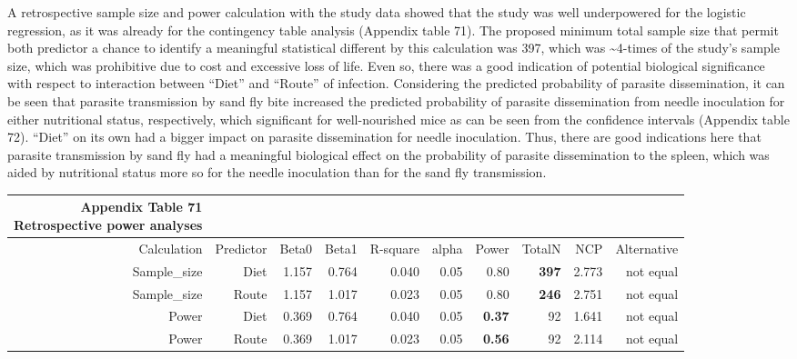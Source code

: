 \documentclass[
  12pt,
  letterpaper,
]{article}
\begin{document}
A retrospective sample size and power calculation with the study data showed that the study was well underpowered for the logistic regression, as it was already for the contingency table analysis (Appendix table 71). The proposed minimum total sample size that permit both predictor a chance to identify a meaningful statistical different by this calculation was 397, which was \textasciitilde4-times of the study's sample size, which was prohibitive due to cost and excessive loss of life. Even so, there was a good indication of potential biological significance with respect to interaction between ``Diet'' and ``Route'' of infection. Considering the predicted probability of parasite dissemination, it can be seen that parasite transmission by sand fly bite increased the predicted probability of parasite dissemination from needle inoculation for either nutritional status, respectively, which significant for well-nourished mice as can be seen from the confidence intervals (Appendix table 72). ``Diet'' on its own had a bigger impact on parasite dissemination for needle inoculation. Thus, there are good indications here that parasite transmission by sand fly had a meaningful biological effect on the probability of parasite dissemination to the spleen, which was aided by nutritional status more so for the needle inoculation than for the sand fly transmission.

\begin{longtable}{rrrrrrrrrr}
\caption*{
{\large \textbf{Appendix Table 71}} \\ 
{\small \textbf{Retrospective power analyses}}
} \\ 
\toprule
Calculation & Predictor & Beta0 & Beta1 & R-square & alpha & Power & TotalN & NCP & Alternative \\ 
\midrule\addlinespace[2.5pt]
Sample\_size & Diet & 1.157 & 0.764 & 0.040 & 0.05 & 0.80 & \textbf{397} & 2.773 & not equal \\ 
Sample\_size & Route & 1.157 & 1.017 & 0.023 & 0.05 & 0.80 & \textbf{246} & 2.751 & not equal \\ 
Power & Diet & 0.369 & 0.764 & 0.040 & 0.05 & \textbf{0.37} & 92 & 1.641 & not equal \\ 
Power & Route & 0.369 & 1.017 & 0.023 & 0.05 & \textbf{0.56} & 92 & 2.114 & not equal \\ 
\bottomrule
\end{longtable}
\end{document}

